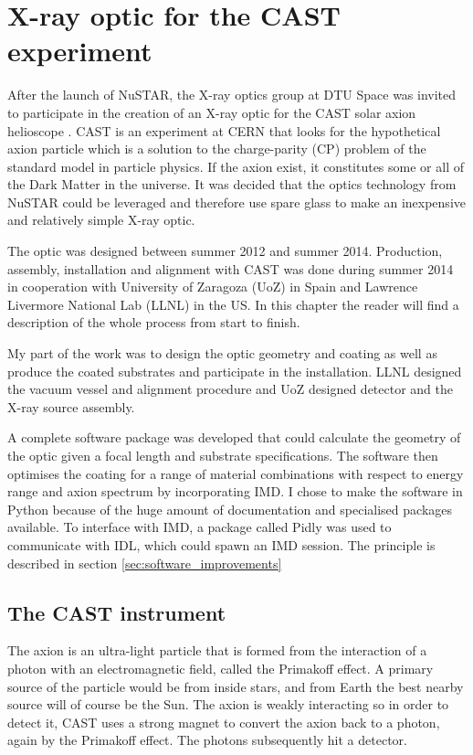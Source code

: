 \chapter{X-ray optic for the CAST experiment}
After the launch of NuSTAR, the X-ray optics group at DTU Space was invited to participate in the creation of an X-ray optic for the CAST solar axion helioscope \cite{Elias:1387488,Iguaz:1389411}. CAST is an experiment at CERN that looks for the hypothetical axion particle\cite{Weinberg:1978ii,Wilczek:1978kp,Peccei:1977ea,Peccei:1977em} which is a solution to the charge-parity (CP) problem of the standard model in particle physics\cite{Cheng:1988fu}. If the axion exist, it constitutes some or all of the Dark Matter in the universe\cite{Visinelli:2011tw,Bae:2008ix}. It was decided that the optics technology from NuSTAR\cite{Christensen:2011wg,Harrison:2010gu,Koglin:2005kb,Zhang:2009cb,Harrison:2013wl} could be leveraged and therefore use spare glass to make an inexpensive and relatively simple X-ray optic.

The optic was designed between summer 2012 and summer 2014. Production, assembly, installation and alignment with CAST was done during summer 2014 in cooperation with University of Zaragoza (UoZ) in Spain and Lawrence Livermore National Lab (LLNL) in the US. In this chapter the reader will find a description of the whole process from start to finish.

My part of the work was to design the optic geometry and coating as well as produce the coated substrates and participate in the installation. LLNL designed the vacuum vessel and alignment procedure and UoZ designed detector and the X-ray source assembly.

A complete software package was developed that could calculate the geometry of the optic given a focal length and substrate specifications. The software then optimises the coating for a range of material combinations with respect to energy range and axion spectrum by incorporating IMD. I chose to make the software in Python because of the huge amount of documentation and specialised packages available. To interface with IMD, a package called Pidly was used to communicate with IDL, which could spawn an IMD session. The principle is described in section \ref{sec:software_improvements}

\section{The CAST instrument}
The axion is an ultra-light particle that is formed from the interaction of a photon with an electromagnetic field, called the Primakoff effect. A primary source of the particle would be from inside stars, and from Earth the best nearby source will of course be the Sun. The axion is weakly interacting so in order to detect it, CAST uses a strong magnet to convert the axion back to a photon, again by the Primakoff effect. The photons subsequently hit a detector.

